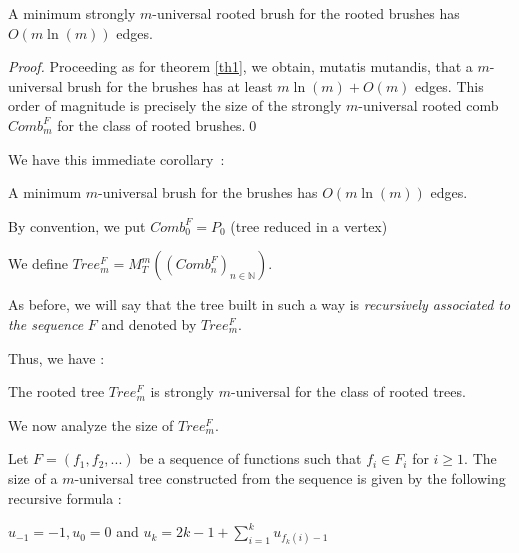 \documentclass{llncs}
\begin{document}
\begin{theorem} A minimum strongly $m$-universal rooted brush for the
rooted brushes has $O(m\ln (m))$ edges.
\end{theorem}




\begin{proof} Proceeding as for theorem \ref{th1}, we obtain, mutatis mutandis, that a
$m$-universal brush for the brushes has at least $m\ln (m) + O(m)$
edges. This order of magnitude is precisely the size of the
strongly $m$-universal rooted comb $Comb_m^F$ for the class of
rooted brushes.\qed
\end{proof}





We have this immediate corollary~:


\begin{corollary} A minimum $m$-universal brush for the brushes has
$O(m\ln (m))$ edges.
\end{corollary}




By convention, we put $Comb_0^F = P_0 $ (tree reduced in a vertex)

We define $Tree_m^F = M_T^m \left( {\left( {Comb_n^F } \right)_{n
\in \mathbb{N}} } \right)$.





As before, we will say that the tree built in such a way is\textit{ recursively associated to the sequence }$F$ and denoted by
$Tree_m^F $.





Thus, we have :





\begin{theorem} The rooted tree $Tree_m^F $ is strongly $m$-universal
for the class of rooted trees.
\end{theorem}




We now analyze the size of $Tree_m^F $.





\begin{proposition} Let $F = \left( {f_1 ,f_2 ,...} \right)$ be a
sequence of functions such that $f_i \in F_i $ for $i \ge 1$. The
size of a $m$-universal tree constructed from the sequence is
given by the following recursive formula :

$u_{ - 1} = - 1, u_0 = 0$ and $u_k = 2k - 1 + \sum\limits_{i =
1}^k {u_{f_k \left( i \right) - 1} } $
\end{proposition}
\end{document}
